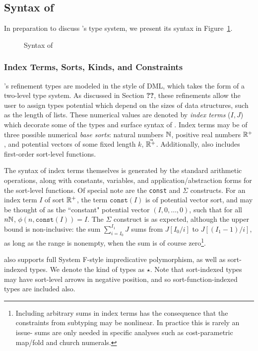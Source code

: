 \subsection{Syntax of \dlambdaamor}

In preparation to discuss \dlambdaamor's type system, we present its syntax in Figure~\ref{fig:dlambdaamor-syntax}.

\begin{figure}

\caption{Syntax of \dlambdaamor}
\label{fig:dlambdaamor-syntax}
\end{figure}

\subsubsection{Index Terms, Sorts, Kinds, and Constraints}
\dlambdaamor's refinement types are modeled in the style of DML, which takes the form of a two-level type system. As discussed in Section \textbf{??}, these refinements allow the user to assign types potential which depend on the sizes of data structures, such as the length of lists. These numerical values are denoted by \textit{index terms} ($I,J$) which decorate some of the types and surface syntax of \dlambdaamor. Index terms may be of three possible numerical \textit{base sorts}: natural numbers $\mathbb{N}$, positive real numbers $\mathbb{R}^+$, and potential vectors of some fixed length $k$, $\vec{\mathbb{R}^+}$. Additionally, \dlambdaamor also includes first-order sort-level functions.

The syntax of index terms themselves is generated by the standard arithmetic operations, along with constants, variables, and application/abstraction forms for the sort-level functions. Of special note are the \texttt{const} and $\Sigma$ constructs. For an index term $I$ of sort $\mathbb{R}^+$, the term $\texttt{const}(I)$ is of potential vector sort, and may be thought of as the ``constant" potential vector $(I,0,\dots,0)$, such that for all $n \mathbb{N}$, $\phi(n,\texttt{const}(I)) = I$.
The $\Sigma$ construct is as expected, although the upper bound is non-inclusive: the sum $\sum_{i=I_0}^{I_1} J$ sums from $J[I_0/i]$ to $J[(I_1-1)/i]$, as long as the range is nonempty, when the sum is of course zero\footnote{
Including arbitrary sums in index terms has the consequence that the constraints from subtyping may be nonlinear. In practice this is rarely an issue- sums are only needed in specific analyses such as cost-parametric map/fold and church numerals.
}.

\dlambdaamor also supports full System F-style impredicative polymorphism, as well as sort-indexed types. We denote the kind of types as $\star$. Note that sort-indexed types may have sort-level arrows in negative position, and so sort-function-indexed types are included also.

